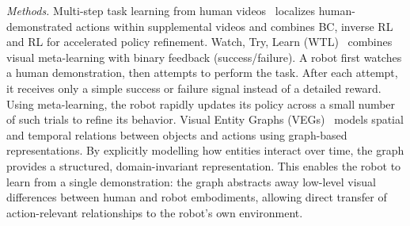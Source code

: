 \textit{Methods.}
Multi-step task learning from human videos~\cite{Goo2018OneShotLO} localizes human-demonstrated actions within supplemental videos and combines \ac{BC}, inverse \ac{RL} and \ac{RL} for accelerated policy refinement.
Watch, Try, Learn (WTL)~\cite{Zhou2019WatchTL} combines visual meta-learning with binary feedback (success/failure). A robot first watches a human demonstration, then attempts to perform the task. After each attempt, it receives only a simple success or failure signal instead of a detailed reward. Using meta-learning, the robot rapidly updates its policy across a small number of such trials to refine its behavior. 
Visual Entity Graphs (VEGs)~\cite{Sieb2019GraphStructuredVI} models spatial and temporal relations between objects and actions using graph-based representations. By explicitly modelling how entities interact over time, the graph provides a structured, domain-invariant representation. This enables the robot to learn from a single demonstration: the graph abstracts away low-level visual differences between human and robot embodiments, allowing direct transfer of action-relevant relationships to the robot's own environment.







